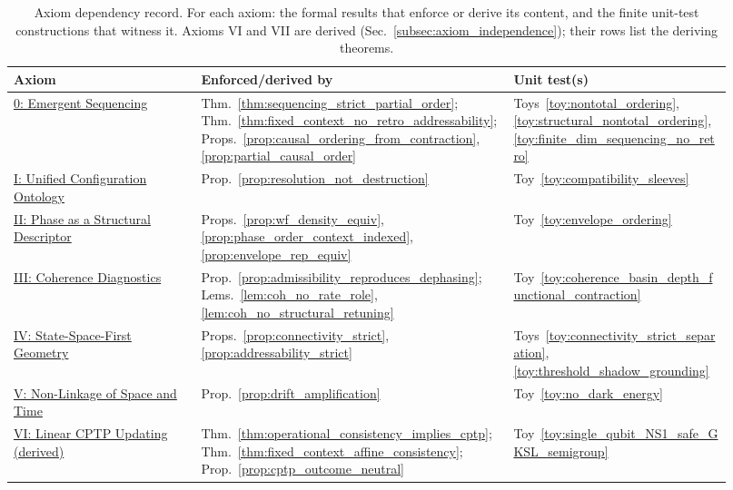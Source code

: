 \documentclass[aps,prx,onecolumn,11pt]{revtex4-2}
\theoremstyle{plain}
\theoremstyle{definition}
\theoremstyle{remark}
\begin{document}
\begin{table}[t]
\centering
\footnotesize
\caption{Axiom dependency record. For each axiom: the formal results
that enforce or derive its content, and the finite unit-test
constructions that witness it. Axioms VI and VII are derived
(Sec.~\ref{subsec:axiom_independence}); their rows list the deriving
theorems.}
\label{tab:axiom_dependency}
\begin{tabular}{p{0.24\linewidth}p{0.40\linewidth}p{0.28\linewidth}}
\toprule
\textbf{Axiom} & \textbf{Enforced/derived by} & \textbf{Unit test(s)} \\
\midrule
\hyperref[ax:sequencing]{0: Emergent Sequencing} &
Thm.~\ref{thm:sequencing_strict_partial_order};
Thm.~\ref{thm:fixed_context_no_retro_addressability};
Props.~\ref{prop:causal_ordering_from_contraction},
\ref{prop:partial_causal_order} &
Toys~\ref{toy:nontotal_ordering},
\ref{toy:structural_nontotal_ordering},
\ref{toy:finite_dim_sequencing_no_retro} \\
\addlinespace
\hyperref[ax:unified_config_ontology]{I: Unified Configuration
Ontology} &
Prop.~\ref{prop:resolution_not_destruction} &
Toy~\ref{toy:compatibility_sleeves} \\
\addlinespace
\hyperref[ax:phase_fundamental_descriptor]{II: Phase as a Structural
Descriptor} &
Props.~\ref{prop:wf_density_equiv},
\ref{prop:phase_order_context_indexed},
\ref{prop:envelope_rep_equiv} &
Toy~\ref{toy:envelope_ordering} \\
\addlinespace
\hyperref[ax:coherence_diagnostics]{III: Coherence Diagnostics} &
Prop.~\ref{prop:admissibility_reproduces_dephasing};
Lems.~\ref{lem:coh_no_rate_role},
\ref{lem:coh_no_structural_retuning} &
Toy~\ref{toy:coherence_basin_depth_functional_contraction} \\
\addlinespace
\hyperref[ax:state_space_first_geometry]{IV: State-Space-First
Geometry} &
Props.~\ref{prop:connectivity_strict},
\ref{prop:addressability_strict} &
Toys~\ref{toy:connectivity_strict_separation},
\ref{toy:threshold_shadow_grounding} \\
\addlinespace
\hyperref[ax:nonlinkage_space_time]{V: Non-Linkage of Space and Time} &
Prop.~\ref{prop:drift_amplification} &
Toy~\ref{toy:no_dark_energy} \\
\addlinespace
\hyperref[ax:linear_cptp_updating]{VI: Linear CPTP Updating
(derived)} &
Thm.~\ref{thm:operational_consistency_implies_cptp};
Thm.~\ref{thm:fixed_context_affine_consistency};
Prop.~\ref{prop:cptp_outcome_neutral} &
Toy~\ref{toy:single_qubit_NS1_safe_GKSL_semigroup} \\

\end{tabular}
\end{table}
\end{document}
